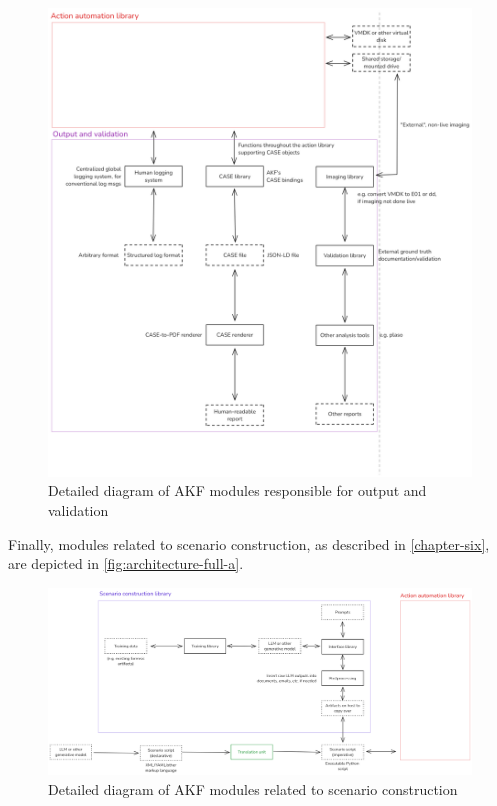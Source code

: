 \documentclass[letterpaper,12pt]{report}
\begin{document}
\begin{figure}[htbp]
\centering
\includegraphics[width=1\linewidth]{architecture-full-c.png}
\caption{Detailed diagram of AKF modules responsible for output and
validation}\label{fig:architecture-full-c}
\end{figure}

Finally, modules related to scenario construction, as described in
\autoref{chapter-six}, are depicted in
\autoref{fig:architecture-full-a}.

\begin{figure}[htbp]
\centering
\includegraphics[width=1\linewidth]{architecture-full-a.png}
\caption{Detailed diagram of AKF modules related to scenario
construction}\label{fig:architecture-full-a}
\end{figure}
\end{document}
